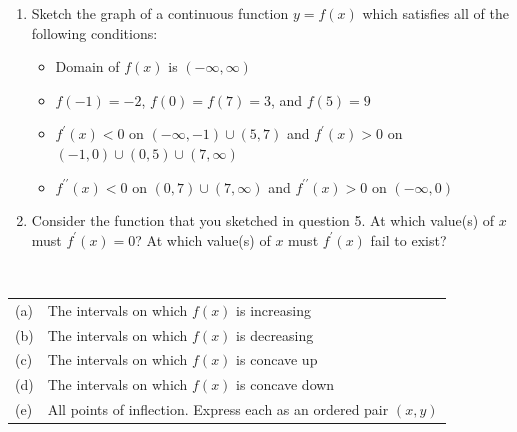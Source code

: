\documentclass[12pt]{article}
\begin{document}
\begin{enumerate}
\item Sketch the graph of a continuous function $y=f(x)$ which satisfies all of the following conditions:

\begin{itemize}

\item Domain of $f(x)$ is $(-\infty,\infty)$

\item $f(-1)=-2$, $f(0)=f(7)=3$, and $f(5)=9$

\item $f^{\prime}(x)<0$ on $(-\infty,-1) \cup (5,7)$ and $f^{\prime}(x)>0$ on $(-1,0)\cup (0,5) \cup (7,\infty)$

\item $f^{\prime \prime}(x)<0$ on $(0,7) \cup (7,\infty)$ and $f^{\prime \prime}(x)>0$ on $(-\infty,0)$

\end{itemize}

\item Consider the function that you sketched in question 5.  At which value(s) of $x$ must $f^{\prime}(x)=0$?  At which value(s) of $x$ must $f^{\prime}(x)$ fail to exist?

\end{enumerate}

\\

\begin{tabular}{ll}
(a) & The intervals on which $f(x)$ is increasing\\
(b) & The intervals on which $f(x)$ is decreasing\\
(c) & The intervals on which $f(x)$ is concave up\\
(d) & The intervals on which $f(x)$ is concave down\\
(e) & All points of inflection.  Express each as an ordered pair $(x,y)$
\end{tabular}\\
\end{document}
